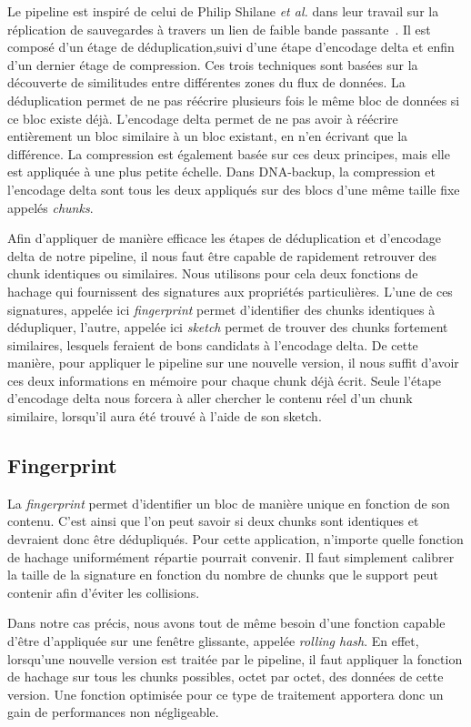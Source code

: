 \documentclass[a4paper]{report}
\makeatletter
\newcommand{\etal}{\emph{et al.}\@\xspace}
\makeatother
\begin{document}
Le pipeline est inspiré de celui de Philip Shilane \etal
dans leur travail sur la réplication de sauvegardes à travers un lien de faible bande passante~\cite{shilane2012wan}.
Il est composé d'un étage de déduplication,suivi d'une étape d'encodage delta
et enfin d'un dernier étage de compression.
Ces trois techniques sont basées sur la découverte de similitudes entre différentes zones du flux de données.
La déduplication permet de ne pas réécrire plusieurs fois le même bloc de données si ce bloc existe déjà.
L'encodage delta permet de ne pas avoir à réécrire entièrement un bloc similaire à un bloc existant,
en n'en écrivant que la différence.
La compression est également basée sur ces deux principes, mais elle est appliquée à une plus petite échelle.
Dans DNA-backup, la compression et l'encodage delta sont tous les deux appliqués sur des blocs d'une même taille fixe appelés \emph{chunks}.

Afin d'appliquer de manière efficace les étapes de déduplication et d'encodage delta de notre pipeline,
il nous faut être capable de rapidement retrouver des chunk identiques ou similaires.
Nous utilisons pour cela deux fonctions de hachage qui fournissent des signatures aux propriétés particulières.
L'une de ces signatures, appelée ici \emph{fingerprint} permet d'identifier des chunks identiques à dédupliquer,
l'autre, appelée ici \emph{sketch} permet de trouver des chunks fortement similaires,
lesquels feraient de bons candidats à l'encodage delta.
De cette manière, pour appliquer le pipeline sur une nouvelle version,
il nous suffit d'avoir ces deux informations en mémoire pour chaque chunk déjà écrit.
Seule l'étape d'encodage delta nous forcera à aller chercher le contenu réel d'un chunk similaire,
lorsqu'il aura été trouvé à l'aide de son sketch.

\subsection{Fingerprint}

La \emph{fingerprint} permet d'identifier un bloc de manière unique en fonction de son contenu.
C'est ainsi que l'on peut savoir si deux chunks sont identiques et devraient donc être dédupliqués.
Pour cette application, n'importe quelle fonction de hachage uniformément répartie pourrait convenir.
Il faut simplement calibrer la taille de la signature en fonction du nombre de chunks que le support peut contenir afin d'éviter les collisions.

Dans notre cas précis, nous avons tout de même besoin d'une fonction capable d'être d'appliquée sur une fenêtre glissante, appelée \emph{rolling hash}.
En effet, lorsqu'une nouvelle version est traitée par le pipeline,
il faut appliquer la fonction de hachage sur tous les chunks possibles, octet par octet, des données de cette version.
Une fonction optimisée pour ce type de traitement apportera donc un gain de performances non négligeable.
\end{document}
